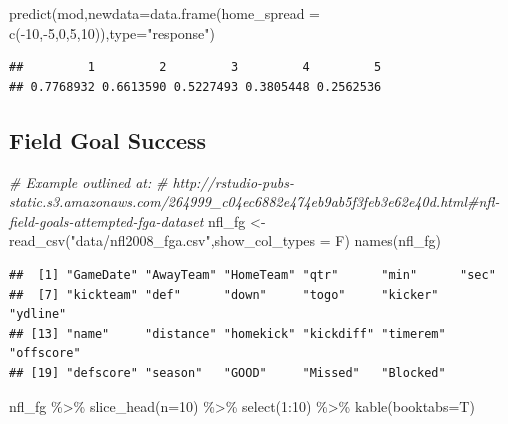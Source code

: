 \documentclass[
  11pt,
]{book}
\newenvironment{Shaded}{\begin{snugshade}}{\end{snugshade}}
\newcommand{\AttributeTok}[1]{\textcolor[rgb]{0.77,0.63,0.00}{#1}}
\newcommand{\CommentTok}[1]{\textcolor[rgb]{0.56,0.35,0.01}{\textit{#1}}}
\newcommand{\DecValTok}[1]{\textcolor[rgb]{0.00,0.00,0.81}{#1}}
\newcommand{\FunctionTok}[1]{\textcolor[rgb]{0.00,0.00,0.00}{#1}}
\newcommand{\NormalTok}[1]{#1}
\newcommand{\OtherTok}[1]{\textcolor[rgb]{0.56,0.35,0.01}{#1}}
\newcommand{\SpecialCharTok}[1]{\textcolor[rgb]{0.00,0.00,0.00}{#1}}
\newcommand{\StringTok}[1]{\textcolor[rgb]{0.31,0.60,0.02}{#1}}
\theoremstyle{definition}
\theoremstyle{definition}
\theoremstyle{definition}
\theoremstyle{definition}
\theoremstyle{remark}
\begin{document}
\begin{Shaded}
\begin{Highlighting}[]
\FunctionTok{predict}\NormalTok{(mod,}\AttributeTok{newdata=}\FunctionTok{data.frame}\NormalTok{(}\AttributeTok{home\_spread =} \FunctionTok{c}\NormalTok{(}\SpecialCharTok{{-}}\DecValTok{10}\NormalTok{,}\SpecialCharTok{{-}}\DecValTok{5}\NormalTok{,}\DecValTok{0}\NormalTok{,}\DecValTok{5}\NormalTok{,}\DecValTok{10}\NormalTok{)),}\AttributeTok{type=}\StringTok{"response"}\NormalTok{)}
\end{Highlighting}
\end{Shaded}

\begin{verbatim}
##         1         2         3         4         5 
## 0.7768932 0.6613590 0.5227493 0.3805448 0.2562536
\end{verbatim}

\newpage

\hypertarget{field-goal-success}{%
\subsection{Field Goal Success}\label{field-goal-success}}

\begin{Shaded}
\begin{Highlighting}[]
\CommentTok{\# Example outlined at:}
\CommentTok{\# http://rstudio{-}pubs{-}static.s3.amazonaws.com/264999\_c04ec6882e474eb9ab5f3feb3e62e40d.html\#nfl{-}field{-}goals{-}attempted{-}fga{-}dataset}
\NormalTok{nfl\_fg }\OtherTok{\textless{}{-}} \FunctionTok{read\_csv}\NormalTok{(}\StringTok{"data/nfl2008\_fga.csv"}\NormalTok{,}\AttributeTok{show\_col\_types =}\NormalTok{ F)}
\FunctionTok{names}\NormalTok{(nfl\_fg)}
\end{Highlighting}
\end{Shaded}

\begin{verbatim}
##  [1] "GameDate" "AwayTeam" "HomeTeam" "qtr"      "min"      "sec"     
##  [7] "kickteam" "def"      "down"     "togo"     "kicker"   "ydline"  
## [13] "name"     "distance" "homekick" "kickdiff" "timerem"  "offscore"
## [19] "defscore" "season"   "GOOD"     "Missed"   "Blocked"
\end{verbatim}

\begin{Shaded}
\begin{Highlighting}[]
\NormalTok{nfl\_fg }\SpecialCharTok{\%\textgreater{}\%} \FunctionTok{slice\_head}\NormalTok{(}\AttributeTok{n=}\DecValTok{10}\NormalTok{) }\SpecialCharTok{\%\textgreater{}\%} \FunctionTok{select}\NormalTok{(}\DecValTok{1}\SpecialCharTok{:}\DecValTok{10}\NormalTok{) }\SpecialCharTok{\%\textgreater{}\%} \FunctionTok{kable}\NormalTok{(}\AttributeTok{booktabs=}\NormalTok{T)}
\end{Highlighting}
\end{Shaded}
\end{document}
